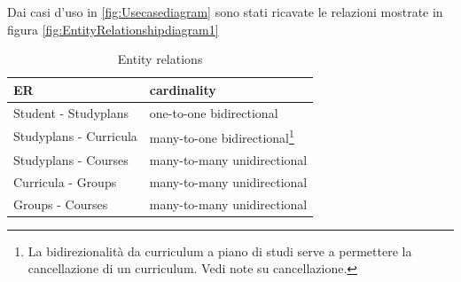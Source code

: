 \documentclass{article}
\begin{document}
Dai casi d'uso in \ref{fig:Usecasediagram} sono stati ricavate le relazioni mostrate in figura \ref{fig:EntityRelationshipdiagram1}
\begin{table}[!h]
  \begin{center}
    \caption{Entity relations}
    \label{tab:Entity Relationship}
    \begin{tabular}{l|l} %
      \textbf{ER} & \textbf{cardinality}  \\ 
      \hline
		Student - Studyplans & one-to-one bidirectional \\
		Studyplans - Curricula & many-to-one bidirectional\footnote{La bidirezionalità da curriculum a piano di studi serve a permettere la cancellazione di un curriculum. Vedi note su cancellazione. } \\
		Studyplans - Courses  & many-to-many unidirectional \\
		Curricula - Groups & many-to-many unidirectional \\
		Groups - Courses & many-to-many unidirectional \\
    \end{tabular}
  \end{center}
\end{table}
\end{document}
